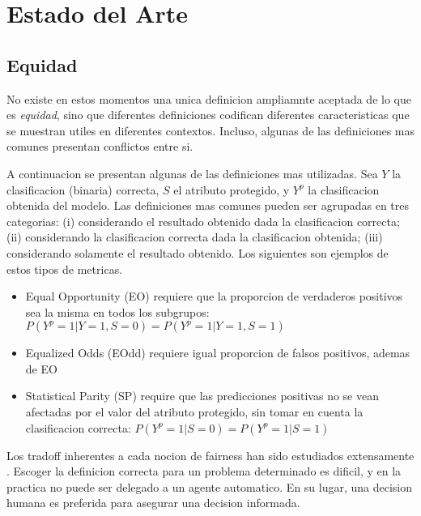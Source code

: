 \chapter{Estado del Arte}\label{chapter:state-of-the-art}


\section{Equidad}

No existe en estos momentos una unica definicion ampliamnte aceptada de lo que es \textit{equidad}, sino que diferentes definiciones codifican diferentes caracteristicas que se muestran utiles en diferentes contextos. Incluso, algunas de las definiciones mas comunes presentan conflictos entre si.

A continuacion se presentan algunas de las definiciones mas utilizadas. Sea $Y$ la clasificacion (binaria) correcta, $S$ el atributo protegido, y $Y^p$ la clasificacion obtenida del modelo. Las definiciones mas comunes pueden ser agrupadas en tres categorias: (i) considerando el resultado obtenido dada la clasificacion correcta; (ii) considerando la clasificacion correcta dada la clasificacion obtenida; (iii) considerando solamente el resultado obtenido. Los siguientes son ejemplos de estos tipos de metricas.

\begin{itemize}
    \item Equal Opportunity (EO) requiere que la proporcion de verdaderos positivos sea la misma en todos los subgrupos: $P(Y^p=1 | Y=1, S=0) = P(Y^p=1 | Y=1, S=1)$
    \item Equalized Odds (EOdd) requiere igual proporcion de falsos positivos, ademas de EO
    \item Statistical Parity (SP) require que las predicciones positivas no se vean afectadas por el valor del atributo protegido, sin tomar en cuenta la clasificacion correcta: $P(Y^p=1 | S=0) = P(Y^p=1 | S=1)$
\end{itemize}

Los tradoff inherentes a cada nocion de fairness han sido estudiados extensamente \parencite{dwork2012fairness, friedler2016possibility, kleinberg2018inherent}. Escoger la definicion correcta para un problema determinado es dificil, y en la practica no puede ser delegado a un agente automatico. En su lugar, una decision humana es preferida para asegurar una decision informada.

